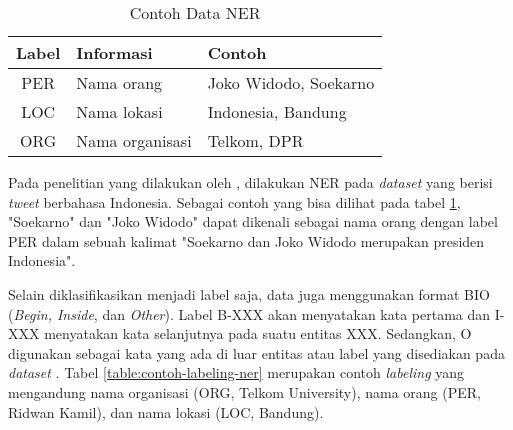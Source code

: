 \begin{table}[h]
    \vspace{0.25cm}
    \caption{Contoh Data NER \parencite{ner}}
    \label{table:contoh-data-ner}
    \begin{center}
        \begin{tabular}{cll}
            \hline
            \textbf{Label} & \textbf{Informasi} & \textbf{Contoh} \\ \hline
            PER & Nama orang & Joko Widodo, Soekarno \\ \hline
            LOC & Nama lokasi & Indonesia, Bandung \\ \hline
            ORG & Nama organisasi & Telkom, DPR \\ \hline
        \end{tabular}
    \end{center}
\end{table}

Pada penelitian yang dilakukan oleh \citeauthor{ner}, dilakukan NER pada \textit{dataset} yang berisi \textit{tweet} berbahasa Indonesia. Sebagai contoh yang bisa dilihat pada tabel \ref{table:contoh-data-ner}, "Soekarno" dan "Joko Widodo" dapat dikenali sebagai nama orang dengan label PER dalam sebuah kalimat "Soekarno dan Joko Widodo merupakan presiden Indonesia". 

Selain diklasifikasikan menjadi label saja, data juga menggunakan format BIO (\textit{Begin, Inside}, dan \textit{Other}). Label B-XXX akan menyatakan kata pertama dan I-XXX menyatakan kata selanjutnya pada suatu entitas XXX. Sedangkan, O digunakan sebagai kata yang ada di luar entitas atau label yang disediakan pada \textit{dataset} \parencite{ner}. Tabel \ref{table:contoh-labeling-ner} merupakan contoh \textit{labeling} yang mengandung nama organisasi (ORG, Telkom University), nama orang (PER, Ridwan Kamil), dan nama lokasi (LOC, Bandung).

